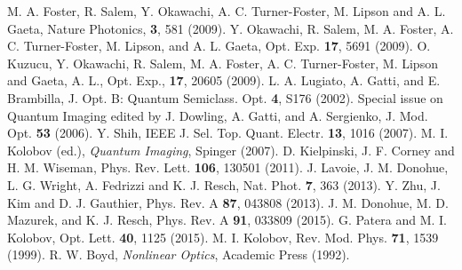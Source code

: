 \documentclass[10pt,twocolumn]{article}
\begin{document}
\begin{thebibliography}{99}
 M. A. Foster, R. Salem, Y. Okawachi, A. C. Turner-Foster, M. Lipson and A. L. Gaeta, Nature Photonics, \textbf{3}, 581 (2009).
 Y. Okawachi, R. Salem, M. A. Foster, A. C. Turner-Foster, M. Lipson, and A. L. Gaeta, Opt. Exp. \textbf{17}, 5691 (2009).
 O. Kuzucu, Y. Okawachi, R. Salem, M. A. Foster, A. C. Turner-Foster, M. Lipson and Gaeta, A. L., Opt. Exp., \textbf{17}, 20605 (2009).
 L. A. Lugiato, A. Gatti, and E. Brambilla, J. Opt. B: Quantum Semiclass. Opt. \textbf{4}, S176 (2002).
 Special issue on Quantum Imaging edited by J. Dowling, A. Gatti, and A. Sergienko, J. Mod. Opt. \textbf{53} (2006).
 Y. Shih, IEEE J. Sel. Top. Quant. Electr. \textbf{13}, 1016 (2007).
 M. I. Kolobov (ed.), \textsl{Quantum Imaging}, Spinger (2007).
 D. Kielpinski, J. F. Corney and H. M. Wiseman, Phys. Rev. Lett. \textbf{106}, 130501 (2011).
 J. Lavoie, J. M. Donohue, L. G. Wright, A. Fedrizzi and K. J. Resch, Nat. Phot. \textbf{7}, 363 (2013).
 Y. Zhu, J. Kim and D. J. Gauthier, Phys. Rev. A \textbf{87}, 043808 (2013).
J. M. Donohue, M. D. Mazurek, and K. J. Resch, Phys. Rev. A \textbf{91}, 033809 (2015).
 G. Patera and M. I. Kolobov, Opt. Lett. \textbf{40}, 1125 (2015).
 M. I. Kolobov, Rev. Mod. Phys. \textbf{71}, 1539 (1999).
 R. W. Boyd, \textsl{Nonlinear Optics}, Academic Press (1992).
\end{thebibliography}
\end{document}
